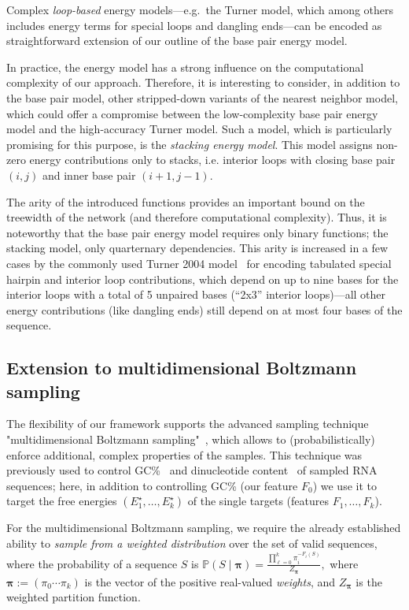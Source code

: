 \documentclass{bmcart}
\newcommand{\partfun}[1]{Z_{#1}}
\newcommand{\Def}[1]{\emph{#1}}
\newcommand{\TargetE}{E^{\star}}
\newcommand{\Nuc}[1]{{\sf #1}}
\newcommand{\Cb}{\Nuc{C}}
\newcommand{\Gb}{\Nuc{G}}
\newcommand{\GCb}{\Gb\Cb}
\newcommand{\citep}[1]{\cite{#1}}
\begin{document}
Complex \Def{loop-based}
 energy models---e.g.~the Turner model,
which among others includes energy terms for special loops and dangling
ends---can be encoded as straightforward extension of our outline of the base pair energy model.

In practice, the energy model has a strong influence on the computational complexity of our approach. Therefore, it is interesting to consider, in addition to the base pair model, other
stripped-down variants of the nearest neighbor model, which could offer a compromise between the low-complexity base pair energy model and the high-accuracy Turner model. 
Such a model, which is particularly promising for this purpose, is the
\Def{stacking energy model}. This model assigns non-zero energy
contributions only to stacks, i.e. interior loops with closing base
pair $(i,j)$ and inner base pair $(i+1,j-1)$.

The arity of the introduced functions provides an important bound on the
treewidth of the network (and therefore computational
complexity). Thus, it is noteworthy that the base pair energy model
requires only binary functions; the stacking model, only quarternary
dependencies. This arity is increased in a few cases by the commonly
used Turner 2004 model~\citep{Turner2009} for encoding tabulated
special hairpin and interior loop contributions, which depend on up to
nine bases for the interior loops with a total of 5 unpaired bases
(``2x3'' interior loops)---all other energy contributions (like
dangling ends) still depend on at most four bases of the sequence.

\subsection*{Extension to multidimensional Boltzmann sampling}\label{sec:multiBoltzmann}
The flexibility of our framework supports the advanced sampling technique "multidimensional Boltzmann sampling"~\citep{Bodini2010}, which allows to (probabilistically) enforce additional, complex properties of the samples.
This technique was previously used to control \GCb\%~\citep{Waldispuehl2011,Reinharz2013} and dinucleotide content~\citep{Zhang2013} of sampled RNA sequences; here, in addition to controlling \GCb\% (our feature $F_0$) we use it to target the free energies $(\TargetE_1,\ldots,\TargetE_k)$ of the single targets (features $F_1,\dots,F_k$).

For the multidimensional Boltzmann sampling, we require the already established ability to \Def{sample from a weighted distribution} over the set of valid sequences, where the probability of a sequence $S$ is
$\mathbb{P}(S\mid \pmb{\pi}) = \frac{\prod_{\ell=0}^{k} \pi_i^{-F_i(S)}}{\partfun{\pmb{\pi}}},$
where $\pmb{\pi}:=(\pi_0\cdots\pi_k)$ is the vector of the positive real-valued \Def{weights}, and $\partfun{\pmb{\pi}}$ is the weighted partition function.
\end{document}
